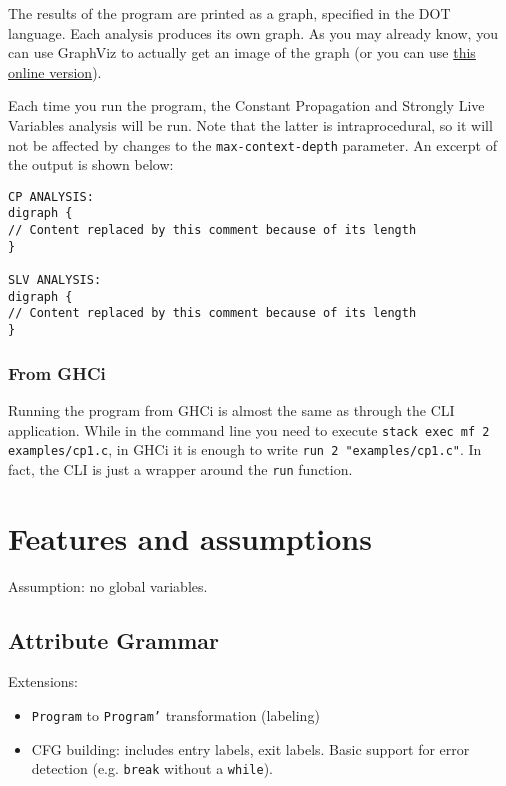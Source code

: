 \documentclass{article}
\begin{document}
The results of the program are printed as a graph, specified in the DOT language.
Each analysis produces its own graph.
As you may already know, you can use GraphViz to actually get an image of the graph (or you can use \href{http://www.webgraphviz.com/}{this online version}).

Each time you run the program, the Constant Propagation and Strongly Live Variables analysis will be run.
Note that the latter is intraprocedural, so it will not be affected by changes to the \texttt{max-context-depth} parameter.
An excerpt of the output is shown below:

\begin{verbatim}
CP ANALYSIS:
digraph {
// Content replaced by this comment because of its length
}

SLV ANALYSIS:
digraph {
// Content replaced by this comment because of its length
}
\end{verbatim}

\subsubsection*{From GHCi}

Running the program from GHCi is almost the same as through the CLI application. While in the command line you need to execute \texttt{stack exec mf 2 examples/cp1.c}, in GHCi it is enough to write \texttt{run 2 "examples/cp1.c"}. In fact, the CLI is just a wrapper around the \texttt{run} function.

\section*{Features and assumptions}


Assumption: no global variables.

\subsection*{Attribute Grammar}

Extensions:

\begin{itemize}
	\item \texttt{Program} to \texttt{Program'} transformation (labeling)
	\item CFG building: includes entry labels, exit labels. Basic support for error detection (e.g. \texttt{break} without a \texttt{while}).
\end{itemize}
\end{document}
